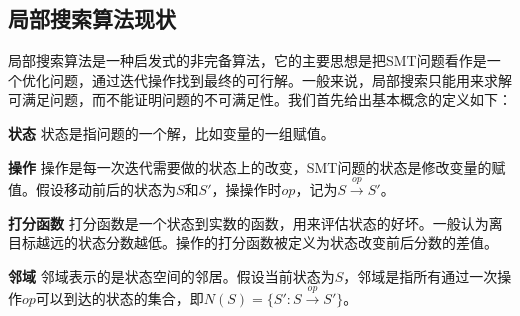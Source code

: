 \subsection{局部搜索算法现状}
局部搜索算法是一种启发式的非完备算法，它的主要思想是把SMT问题看作是一个优化问题，通过迭代操作找到最终的可行解。一般来说，局部搜索只能用来求解可满足问题，而不能证明问题的不可满足性。我们首先给出基本概念的定义如下：

\begin{definition}{\textbf{状态}}
状态是指问题的一个解，比如变量的一组赋值。
\end{definition}

\begin{definition}{\textbf{操作}}
操作是每一次迭代需要做的状态上的改变，SMT问题的状态是修改变量的赋值。假设移动前后的状态为$S$和$S'$，操操作时$op$，记为$S \xrightarrow{op} S'$。
\end{definition}

\begin{definition}{\textbf{打分函数}}
打分函数是一个状态到实数的函数，用来评估状态的好坏。一般认为离目标越远的状态分数越低。操作的打分函数被定义为状态改变前后分数的差值。
\end{definition}

\begin{definition}{\textbf{邻域}}
邻域表示的是状态空间的邻居。假设当前状态为$S$，邻域是指所有通过一次操作$op$可以到达的状态的集合，即$N(S) = \{S' : S \xrightarrow{op} S'\}$。
\end{definition}

